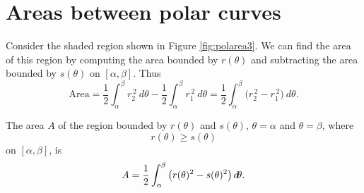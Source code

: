 \documentclass{ximera}
\begin{document}


\section{Areas between polar curves}

Consider the shaded region shown in Figure \ref{fig:polarea3}. We can
find the area of this region by computing the area bounded by
$r(\theta)$ and subtracting the area bounded by $s(\theta)$ on
$[\alpha,\beta]$. Thus
\[
\text{Area} = \frac12\int_\alpha^\beta r_2^{\,2}\ d\theta -
\frac12\int_\alpha^\beta r_1^{\,2}\ d\theta = \frac12\int_\alpha^\beta
\big(r_2^{\,2}-r_1^{\,2}\big)\ d\theta.
\]


\begin{theorem}
The area $A$ of the region bounded by $r(\theta)$ and $s(\theta)$,
$\theta=\alpha$ and $\theta=\beta$, where
\[
r(\theta)\ge s(\theta)
\]
on $[\alpha,\beta]$, is
\[
A = \frac12\int_\alpha^\beta \big(r(\theta)^2-s(\theta)^2\big)\mathop{}\!d\! \theta.
\]
\end{theorem}
\end{document}

